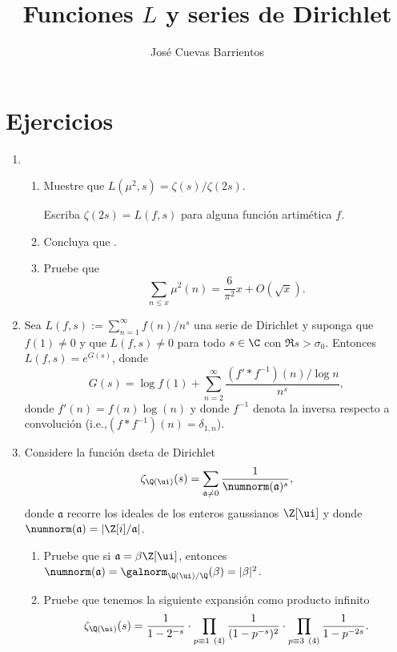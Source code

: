 \documentclass[11pt, reqno]{amsart}
\title{Funciones $L$ y series de Dirichlet}
\date{\DTMdate{2025-10-03}}
\author[José Cuevas]{José Cuevas Barrientos}
\begin{document}
\maketitle

\section{Ejercicios}
\begin{enumerate}
	\item \begin{enumerate}
			\item\lookright Muestre que $L(\mu^2, s) = \zeta(s)/\zeta(2s)$.
				\begin{hint}
					Escriba $\zeta(2s) = L(f, s)$ para alguna función artimética $f$.
				\end{hint}

			\item Concluya que .

			\item Pruebe que
				\[
					\displaystyle \sum_{n\le x} \mu^2(n) = \frac{6}{\pi^2} x + O(\sqrt{x}).
				\]
		\end{enumerate}

		\newex
	\item Sea $L(f, s) := \sum_{n=1}^{\infty} f(n)/n^s$ una serie de Dirichlet y suponga que $f(1) \ne 0$ y que $L(f, s) \ne 0$ para
		todo $s \in \C$ con $\Re s > \sigma_0$.
		Entonces $L(f, s) = e^{G(s)}$, donde
		\[
			G(s) = \log f(1) + \sum_{n=2}^{\infty} \frac{(f' * f^{-1})(n)/\log n}{n^s},
		\]
		donde $f'(n) = f(n)\log(n)$ y donde $f^{-1}$ denota la inversa respecto a convolución
		(i.e.,\break $(f * f^{-1})(n) = \delta_{1, n}$).
		\nocite{apostol:analytic}

		\newex
	\item\label{ex:dirichlet_zeta}\lookright
		Considere la función dseta de Dirichlet
		\[
			\zeta_{\Q(\ui)}(s) = \sum_{\mathfrak{a}\ne 0} \frac{1}{\numnorm(\mathfrak{a})^s},
		\]
		donde $\mathfrak{a}$ recorre los ideales de los enteros gaussianos $\Z[\ui]$ y donde $\numnorm(\mathfrak{a}) = |\Z[i] / \mathfrak{a}|$.
		\begin{enumerate}
			\item Pruebe que si $\mathfrak{a} = \beta \Z[\ui]$, entonces $\numnorm(\mathfrak{a}) = \galnorm_{\Q(\ui)/\Q}(\beta)
				= |\beta|^2$.

			\item Pruebe que tenemos la siguiente expansión como producto infinito
				\[
					\zeta_{\Q(\ui)}(s) = \frac{1}{1 - 2^{-s}} \cdot \prod_{p\equiv 1\pod 4} \frac{1}{(1 - p^{-s})^2}
					\cdot \prod_{p\equiv 3 \pod 4} \frac{1}{1 - p^{-2s}}.
				\]


\end{enumerate}
\end{enumerate}
\end{document}
